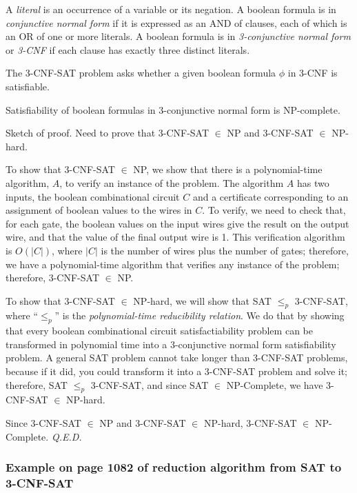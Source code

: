 A {\it literal} is an occurrence of a variable or its negation.  A boolean formula is in {\it conjunctive normal form} if it is expressed as an AND of clauses, each of which is an OR of one or more literals.  A boolean formula is in {\it 3-conjunctive normal form} or {\it 3-CNF} if each clause has exactly three distinct literals.  

The 3-CNF-SAT problem asks whether a given boolean formula $\phi$ in 3-CNF is satisfiable.  

\begin{theorem}
	Satisfiability of boolean formulas in 3-conjunctive normal form is NP-complete.  
\end{theorem}

Sketch of proof.  Need to prove that 3-CNF-SAT $\in$ NP and 3-CNF-SAT $\in$ NP-hard.   

To show that 3-CNF-SAT $\in$ NP, we show that there is a polynomial-time algorithm, $A$, to verify an instance of the problem.  The algorithm $A$ has two inputs, the boolean combinational circuit $C$ and a certificate corresponding to an assignment of boolean values to the wires in $C$.  To verify, we need to check that, for each gate, the boolean values on the input wires give the result on the output wire, and that the value of the final output wire is 1.  This verification algorithm is $O(|C|)$, where $|C|$ is the number of wires plus the number of gates; therefore, we have a polynomial-time algorithm that verifies any instance of the problem; therefore, 3-CNF-SAT $\in$ NP.  

To show that 3-CNF-SAT $\in$ NP-hard, we will show that SAT $\le_p$ 3-CNF-SAT, where ``$\le_p$'' is the {\it polynomial-time reducibility relation}. We do that by showing that every boolean combinational circuit satisfactiability problem can be transformed in polynomial time into a 3-conjunctive normal form satisfiability problem.  A general SAT problem cannot take longer than 3-CNF-SAT problems, because if it did, you could transform it into a 3-CNF-SAT problem and solve it; therefore, SAT $\le_p$ 3-CNF-SAT, and since SAT $\in$ NP-Complete, we have 3-CNF-SAT $\in$ NP-hard.  

Since 3-CNF-SAT $\in$ NP and 3-CNF-SAT $\in$ NP-hard, 3-CNF-SAT $\in$ NP-Complete.  {\it Q.E.D.}

\subsubsection{Example on page 1082 of reduction algorithm from SAT to 3-CNF-SAT}

